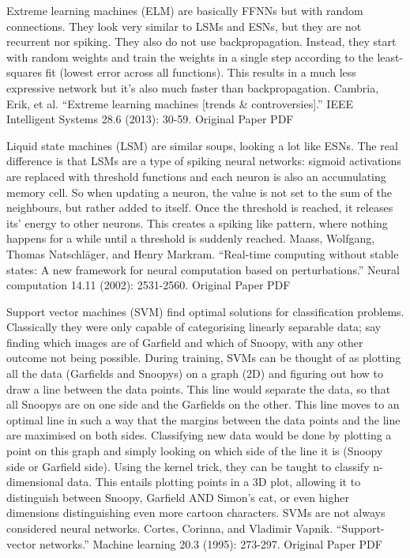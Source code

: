 \documentclass[11pt,a4paper,oneside]{ctexbook}
\begin{document}
Extreme learning machines (ELM) are basically FFNNs but with random connections. They look very similar to LSMs and ESNs, but they are not recurrent nor spiking. They also do not use backpropagation. Instead, they start with random weights and train the weights in a single step according to the least-squares fit (lowest error across all functions). This results in a much less expressive network but it’s also much faster than backpropagation.
Cambria, Erik, et al. “Extreme learning machines [trends \& controversies].” IEEE Intelligent Systems 28.6 (2013): 30-59.
Original Paper PDF


Liquid state machines (LSM) are similar soups, looking a lot like ESNs. The real difference is that LSMs are a type of spiking neural networks: sigmoid activations are replaced with threshold functions and each neuron is also an accumulating memory cell. So when updating a neuron, the value is not set to the sum of the neighbours, but rather added to itself. Once the threshold is reached, it releases its’ energy to other neurons. This creates a spiking like pattern, where nothing happens for a while until a threshold is suddenly reached.
Maass, Wolfgang, Thomas Natschläger, and Henry Markram. “Real-time computing without stable states: A new framework for neural computation based on perturbations.” Neural computation 14.11 (2002): 2531-2560.
Original Paper PDF


Support vector machines (SVM) find optimal solutions for classification problems. Classically they were only capable of categorising linearly separable data; say finding which images are of Garfield and which of Snoopy, with any other outcome not being possible. During training, SVMs can be thought of as plotting all the data (Garfields and Snoopys) on a graph (2D) and figuring out how to draw a line between the data points. This line would separate the data, so that all Snoopys are on one side and the Garfields on the other. This line moves to an optimal line in such a way that the margins between the data points and the line are maximised on both sides. Classifying new data would be done by plotting a point on this graph and simply looking on which side of the line it is (Snoopy side or Garfield side). Using the kernel trick, they can be taught to classify n-dimensional data. This entails plotting points in a 3D plot, allowing it to distinguish between Snoopy, Garfield AND Simon’s cat, or even higher dimensions distinguishing even more cartoon characters. SVMs are not always considered neural networks.
Cortes, Corinna, and Vladimir Vapnik. “Support-vector networks.” Machine learning 20.3 (1995): 273-297.
Original Paper PDF
\end{document}

